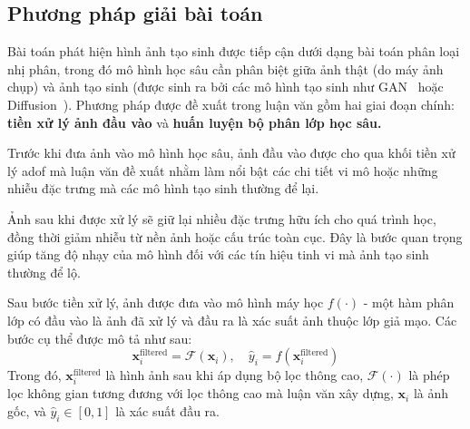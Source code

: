 \subsection{Phương pháp giải bài toán}

Bài toán phát hiện hình ảnh tạo sinh được tiếp cận dưới dạng bài toán phân loại nhị phân, trong đó mô hình học sâu cần phân biệt giữa ảnh thật (do máy ảnh chụp) và ảnh tạo sinh (được sinh ra bởi các mô hình tạo sinh như GAN~\cite{Goodfellow2014GenerativeAN} hoặc Diffusion~\cite{Ho2020DenoisingDP}). Phương pháp được đề xuất trong luận văn gồm hai giai đoạn chính: \textbf{tiền xử lý ảnh đầu vào} và \textbf{huấn luyện bộ phân lớp học sâu.}


Trước khi đưa ảnh vào mô hình học sâu, ảnh đầu vào được cho qua khối tiền xử lý \gls{adof} mà luận văn đề xuất nhằm làm nổi bật các chi tiết vi mô hoặc những nhiễu đặc trưng mà các mô hình tạo sinh thường để lại.

Ảnh sau khi được xử lý sẽ giữ lại nhiều đặc trưng hữu ích cho quá trình học, đồng thời giảm nhiễu từ nền ảnh hoặc cấu trúc toàn cục. Đây là bước quan trọng giúp tăng độ nhạy của mô hình đối với các tín hiệu tinh vi mà ảnh tạo sinh thường để lộ.

Sau bước tiền xử lý, ảnh được đưa vào mô hình máy học \( f(\cdot) \) - một hàm phân lớp có đầu vào là ảnh đã xử lý và đầu ra là xác suất ảnh thuộc lớp giả mạo. Các bước cụ thể được mô tả như sau:
\[
\mathbf{x}_i^{\text{filtered}} = \mathcal{F}(\mathbf{x}_i), \quad \hat{y}_i = f(\mathbf{x}_i^{\text{filtered}})
\]
Trong đó,
\(\mathbf{x}_i^{\text{filtered}}\) là hình ảnh sau khi áp dụng bộ lọc thông cao,
\( \mathcal{F}(\cdot) \) là phép lọc không gian tương đương với lọc thông cao mà luận văn xây dựng,
\( \mathbf{x}_i \) là ảnh gốc, và \( \hat{y}_i \in [0,1] \) là xác suất đầu ra.

